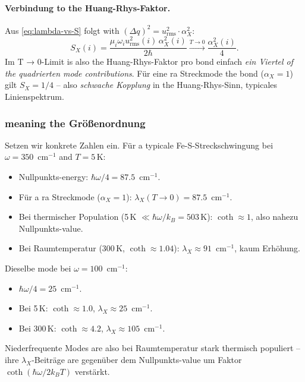 \documentclass[11pt,a4paper,twoside]{article}
\theoremstyle{remark}
\begin{document}
\paragraph{Verbindung to the Huang-Rhys-Faktor.}
Aus \eqref{eq:lambda-vs-S} folgt with $(\Delta q)^2 = u_\text{rms}^2 \cdot \alpha_X^2$:
\begin{equation}
  S_X(i) = \frac{\mu_i\omega_i u_\text{rms}^2(i)\,\alpha_X^2(i)}{2\hbar}
  \xrightarrow{T \to 0} \frac{\alpha_X^2(i)}{4}.
\end{equation}
Im T → 0-Limit is also the Huang-Rhys-Faktor pro bond
einfach \emph{ein Viertel of the quadrierten mode contributions}. F\"ur eine
ra Streckmode the bond ($\alpha_X = 1$) gilt
$S_X = 1/4$ -- also \emph{schwache Kopplung} in the Huang-Rhys-Sinn,
typicales Linienspektrum.

\subsubsection*{meaning the Gr\"o{\ss}enordnung}

Setzen wir konkrete Zahlen ein. F\"ur a typicale
Fe-S-Streckschwingung bei $\omega = 350$~cm$^{-1}$ and $T = 5$\,K:
\begin{itemize}\setlength{\itemsep}{0pt}
  \item Nullpunkts-energy: $\hbar\omega/4 = 87.5$~cm$^{-1}$.
  \item F\"ur a ra Streckmode ($\alpha_X = 1$):
        $\lambda_X(T \to 0) = 87.5$~cm$^{-1}$.
  \item Bei thermischer Population (5\,K $\ll \hbar\omega/k_B = 503$\,K):
        $\coth \approx 1$, also nahezu Nullpunkts-value.
  \item Bei Raumtemperatur (300\,K, $\coth \approx 1.04$):
        $\lambda_X \approx 91$~cm$^{-1}$, kaum Erh\"ohung.
\end{itemize}

Dieselbe mode bei $\omega = 100$~cm$^{-1}$:
\begin{itemize}\setlength{\itemsep}{0pt}
  \item $\hbar\omega/4 = 25$~cm$^{-1}$.
  \item Bei 5\,K: $\coth \approx 1.0$, $\lambda_X \approx 25$~cm$^{-1}$.
  \item Bei 300\,K: $\coth \approx 4.2$, $\lambda_X \approx 105$~cm$^{-1}$.
\end{itemize}
Niederfrequente Modes are also bei Raumtemperatur stark thermisch
populiert -- ihre $\lambda_X$-Beitr\"age are gegen\"uber dem
Nullpunkts-value um Faktor $\coth(\hbar\omega/2k_BT)$ verst\"arkt.
\end{document}
